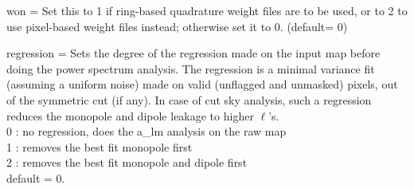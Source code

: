 \begin{qualifiers}
\begin{qulist}{}
\item[{won = }]%
 Set this to 1 if ring-based quadrature weight files are to be used,
 or to 2 to use pixel-based weight files instead;
otherwise set it to 0. (default= 0)
\item[{regression = }]%
 {{Sets the degree of the regression made on the
input map before doing the power spectrum analysis. 
The regression is a minimal variance fit (assuming a uniform noise) 
made on valid (unflagged and unmasked) pixels, out of the symmetric cut (if
any). In case of cut sky analysis, such a regression reduces the monopole
and dipole leakage to higher $\ell$'s.\\
0 : no regression, does the a\_lm analysis on the raw map\\
1 : removes the best fit monopole first\\
2 : removes the best fit monopole and dipole first\\
default = 0.}}
 
  \end{qulist}
\end{qualifiers}
\vfill

